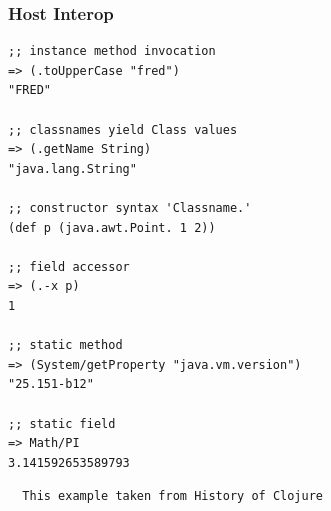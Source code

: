 \documentclass{beamer}
\begin{document}
\begin{frame}[fragile]
  \frametitle{Host Interop}
  \begin{verbatim}
;; instance method invocation
=> (.toUpperCase "fred")
"FRED"

;; classnames yield Class values
=> (.getName String)
"java.lang.String"

;; constructor syntax 'Classname.'
(def p (java.awt.Point. 1 2))

;; field accessor
=> (.-x p)
1

;; static method
=> (System/getProperty "java.vm.version")
"25.151-b12"

;; static field
=> Math/PI
3.141592653589793
  \end{verbatim}
  \Tiny\begin{verbatim}
  This example taken from History of Clojure  
  \end{verbatim}
\end{frame}

\end{document}
